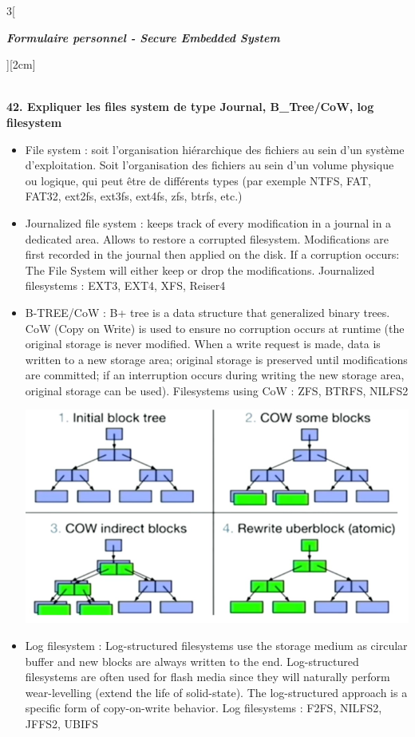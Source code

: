 \begin{multicols}{3}[\centerline{ \large\em \textbf{Formulaire personnel - Secure Embedded System}}][2cm]
\begin{minipage}{\linewidth}
\end{minipage}
\\ \textbf{42. Expliquer les files system de type Journal, B\_Tree/CoW, log filesystem}
\begin{itemize}
\item File system : soit l'organisation hiérarchique des fichiers au sein d'un système d'exploitation. Soit l'organisation des fichiers au sein d'un volume physique ou logique, qui peut être de différents types (par exemple NTFS, FAT, FAT32, ext2fs, ext3fs, ext4fs, zfs, btrfs, etc.)
\item Journalized file system : keeps track of every modification in a journal in a dedicated area. Allows to restore a corrupted filesystem. Modifications are first recorded in the journal then applied on the disk. If a corruption occurs: The File System will either keep or drop the modifications. Journalized filesystems : EXT3, EXT4, XFS, Reiser4
\item B-TREE/CoW : B+ tree is a data structure that generalized binary trees. CoW (Copy on Write) is used to ensure no corruption occurs at runtime (the original storage is never modified. When a write request is made, data is written to a new storage area; original storage is preserved until modifications are committed; if an interruption occurs during writing the new storage area, original storage can be used). Filesystems using CoW : ZFS, BTRFS, NILFS2\\
\begin{minipage}{\linewidth}
	\centering
    \includegraphics[width =\columnwidth]{images/29.png}
\end{minipage}
\item Log filesystem : Log-structured filesystems use the storage medium as circular buffer and new blocks are always written to the end. Log-structured filesystems are often used for flash media since they will naturally perform wear-levelling (extend the life of solid-state). The log-structured approach is a specific form of copy-on-write behavior. Log filesystems : F2FS, NILFS2, JFFS2, UBIFS\\

\end{itemize}
\end{multicols}
